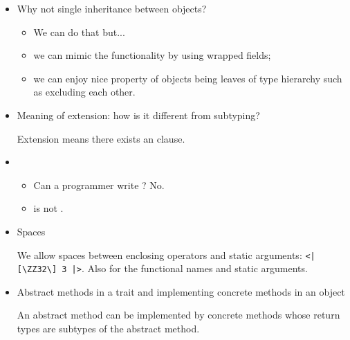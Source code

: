 \begin{itemize}
\item Why not single inheritance between objects?
  \begin{itemize}
  \item We can do that but...
  \item we can mimic the functionality by using wrapped fields;
  \item we can enjoy nice property of objects being leaves of type
  hierarchy such as excluding each other.
  \end{itemize}

\item Meaning of extension: how is it different from subtyping?

Extension means there exists an  clause.

\item {}
  \begin{itemize}
\item Can a programmer write ?  No.
\item {} is not .
  \end{itemize}

\item Spaces

We allow spaces between enclosing operators and static arguments: \verb+<| [\ZZ32\] 3 |>+.
Also for the functional names and static arguments.

\item Abstract methods in a trait and implementing concrete methods in an object

An abstract method can be implemented by concrete methods whose return types are
subtypes of the abstract method.


\end{itemize}
